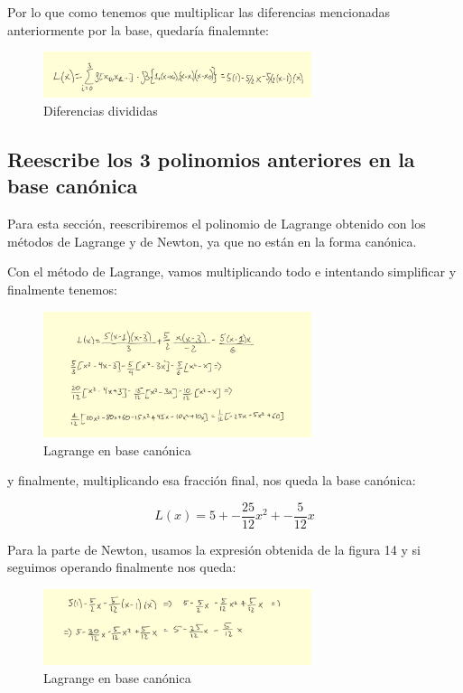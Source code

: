 \documentclass{article}
\begin{document}
Por lo que como tenemos que multiplicar las diferencias mencionadas anteriormente por la base, quedaría finalemnte:

\begin{figure}[h]
  \center
  \includegraphics[width=0.7\textwidth]{src/newtonsol1.jpg}
  \caption{Diferencias divididas}
\end{figure}

\newpage


\subsection{Reescribe los 3 polinomios anteriores en la base canónica}

Para esta sección, reescribiremos el polinomio de Lagrange obtenido con los métodos de Lagrange y de Newton, ya que no están en la forma canónica.

Con el método de Lagrange, vamos multiplicando todo e intentando simplificar y finalmente tenemos:

\begin{figure}[h]
  \center
  \includegraphics[width=0.7\textwidth]{src/expresionbase1.jpg}
  \caption{Lagrange en base canónica}
\end{figure}

y finalmente, multiplicando esa fracción final, nos queda la base canónica:

\begin{equation}
  L(x) = 5 + -\frac{25}{12}x^{2} + -\frac{5}{12}x
\end{equation}

Para la parte de Newton, usamos la expresión obtenida de la figura 14 y si seguimos operando finalmente nos queda:

\begin{figure}[h]
  \center
  \includegraphics[width=0.7\textwidth]{src/expresionbase2.jpg}
  \caption{Lagrange en base canónica}
\end{figure}
\end{document}
